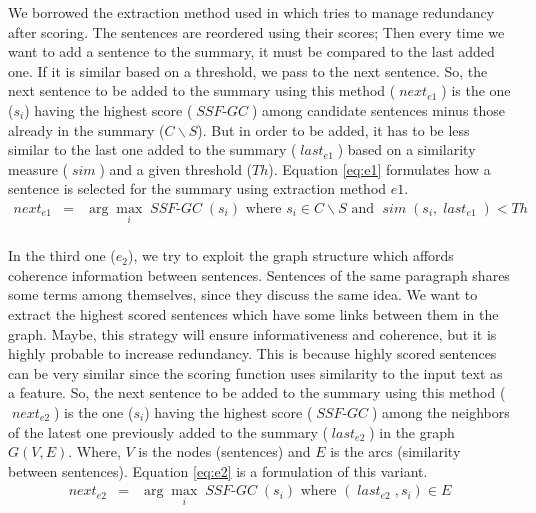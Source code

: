 \documentclass[12pt, oneside, a4paper]{article}
\DeclareMathOperator{\ssfgc}{\textit{SSF-GC}}
\DeclareMathOperator{\simil}{\textit{sim}}
\DeclareMathOperator{\nextsent}{\textit{next}}
\DeclareMathOperator{\lastsent}{\textit{last}}
\begin{document}
We borrowed the extraction method used in \citep{15-aries-al} which tries to manage redundancy after scoring.
The sentences are reordered using their scores; Then every time we want to add a sentence to the summary, it must be compared to the last added one.
If it is similar based on a threshold, we pass to the next sentence.
So, the next sentence to be added to the summary using this method ($\nextsent_{e1}$) is the one ($s_i$) having the highest score ($ \ssfgc $) among candidate sentences minus those already in the summary ($ C\backslash S $).
But in order to be added, it has to be less similar to the last one added to the summary ($\lastsent_{e1}$) based on a similarity measure ($\simil$) and a given threshold ($Th$).
Equation \ref{eq:e1} formulates how a sentence is selected for the summary using extraction method $e1$.
\begin{equation}
\begin{aligned}
\nextsent_{e1} & = & \arg\max\limits_i \ssfgc(s_i)
\text{ where } s_i \in C\backslash S \text{ and } \simil(s_i, \lastsent_{e1}) < Th\\
\end{aligned}
\label{eq:e1}
\end{equation}

In the third one ($ e_2 $), we try to exploit the graph structure which affords coherence information between sentences.
Sentences of the same paragraph shares some terms among themselves, since they discuss the same idea.
We want to extract the highest scored sentences which have some links between them in the graph.
Maybe, this strategy will ensure informativeness and coherence, but it is highly probable to increase redundancy. 
This is because highly scored sentences can be very similar since the scoring function uses similarity to the input text as a feature.  
So, the next sentence to be added to the summary using this method ($\nextsent_{e2}$) is the one ($s_i$) having the highest score ($ \ssfgc $) among the neighbors of the latest one previously added to the summary ($\lastsent_{e2}$) in the graph $ G(V, E) $.
Where, $ V $ is the nodes (sentences) and $ E $ is the arcs (similarity between sentences). 
Equation \ref{eq:e2} is a formulation of this variant.
\begin{equation}
\begin{aligned}
\nextsent_{e2} & = & \arg\max\limits_i \ssfgc(s_i)  
\text{ where } (\lastsent_{e2}, s_i) \in E \\
\end{aligned}
\label{eq:e2}
\end{equation}
\end{document}
